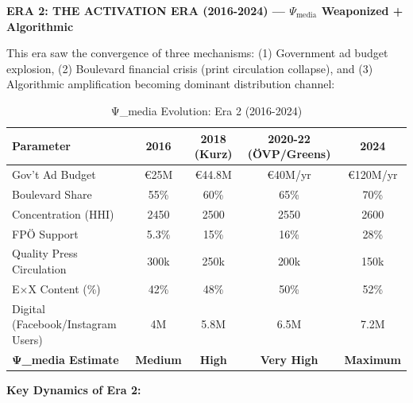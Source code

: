 \vspace{0.3cm}

\textbf{ERA 2: THE ACTIVATION ERA (2016-2024) — $\Psi_{\text{media}}$ Weaponized + Algorithmic}

This era saw the convergence of three mechanisms: (1) Government ad budget explosion, (2) Boulevard
financial crisis (print circulation collapse), and (3) Algorithmic amplification becoming dominant
distribution channel:

\begin{table}[h]
\centering
\caption{Ψ_media Evolution: Era 2 (2016-2024)}
\label{tab:dx-psi-evolution-era2}
\begin{tabular}{|l|c|c|c|c|}
\hline
\textbf{Parameter} & \textbf{2016} & \textbf{2018 (Kurz)} & \textbf{2020-22 (ÖVP/Greens)} & \textbf{2024} \\
\hline
Gov't Ad Budget & €25M & €44.8M & €40M/yr & €120M/yr \\
Boulevard Share & 55\% & 60\% & 65\% & 70\% \\
Concentration (HHI) & 2450 & 2500 & 2550 & 2600 \\
FPÖ Support & 5.3\% & 15\% & 16\% & 28\% \\
Quality Press Circulation & 300k & 250k & 200k & 150k \\
E×X Content (\%) & 42\% & 48\% & 50\% & 52\% \\
Digital (Facebook/Instagram Users) & 4M & 5.8M & 6.5M & 7.2M \\
\hline
\textbf{Ψ_media Estimate} & \textbf{Medium} & \textbf{High} & \textbf{Very High} & \textbf{Maximum} \\
\hline
\end{tabular}
\end{table}

\textbf{Key Dynamics of Era 2:}

